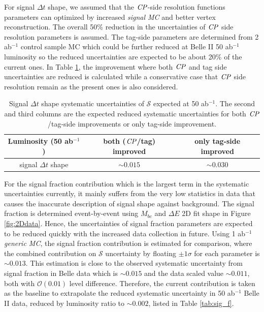 For signal $\Delta t$ shape, we assumed that the $\it{CP}$-side resolution functions parameters can optimized by increased \textit{signal MC} and better vertex reconstruction. The overall 50\% reduction in the uncertainties of $\it{CP}$ side resolution parameters is assumed. The tag-side parameters are determined from 2 ab$^{-1}$ control sample MC which could be further reduced at Belle II  50 ab$^{-1}$ luminosity so the reduced uncertainties are expected to be about 20\% of the current ones. In Table  \ref{tab:sig_shape}, the improvement where both $\it{CP}$ and tag side uncertainties are reduced is calculated while a conservative case that $\it{CP}$ side resolution remain as the present ones is also considered.
\begin{table}[H]
		\centering
		\caption{ Signal $\Delta t$ shape systematic uncertainties of $\mathcal{S}$ expected at 50 ab$^{-1}$. The second and third columns are the expected reduced systematic uncertainties for both $\it{CP}$/tag-side improvements or only tag-side improvement.}
		\label{tab:sig_shape}
		\begin{tabular}{c| c| c }
			\hline
			Luminosity (50 ab$^{-1}$) & both ($\it{CP}$/tag) improved & only tag-side improved \\
			\hline
			signal $\Delta t$ shape &  $\sim0.015$ & $\sim0.030$\\
			\hline
		\end{tabular}
\end{table}
For the signal fraction contribution which is the largest term in the systematic uncertainties currently, it mainly suffers from the very low statistics in data that causes the inaccurate description of signal shape against background. The signal fraction is determined event-by-event using $M_{bc}$ and $\Delta E$ 2D fit shape in Figure \ref{fig:2Ddata}. Hence, the uncertainties of signal fraction parameters are expected to be reduced quickly with the increased data collection in future. Using 1 ab$^{-1}$ \textit{generic MC}, the signal fraction contribution is estimated for comparison, where the combined contribution on $\mathcal{S}$ uncertainty by floating $\pm 1 \sigma$ for each parameter is $\sim 0.013$. This estimation is close to the observed systematic uncertainty from signal fraction in  Belle data which is  $\sim0.015$\cite{kang2020measurement} and the data scaled value  $\sim 0.011$, both with $\mathcal{O}(0.01)$ level difference. Therefore, the current contribution is taken as the baseline to extrapolate the reduced systematic uncertainty in 50 ab$^{-1}$ Belle II data, reduced by luminosity ratio to $\sim 0.002$, listed in Table \ref{tab:sig_f}.


